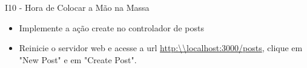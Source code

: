 \begin{frame}[t, fragile]{I10 - Hora de Colocar a Mão na Massa}
	\begin{itemize}
		\item Implemente a ação \alert{create} no controlador de posts
		\item Reinicie o servidor web e acesse a url \url{http:\\localhost:3000/posts}, clique em \alert{"New Post"} e em \alert{"Create Post"}.
	\end{itemize}
\end{frame}